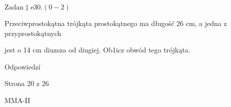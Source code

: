 \documentclass[a4paper,12pt]{article}
\begin{document}
$\mathrm{Z}\mathrm{a}\mathrm{d}\mathrm{a}\mathrm{n}\ddagger \mathrm{e}30. (0-2)$

Przeciwprostokątna trójkąta prostokątnego ma długość 26 cm, a jedna z przyprostokątnych

jest o 14 cm diuzsza od diugiej. Ob1icz obwód tego trójkąta.

Odpowiedzí

Strona 20 z 26

MMA-II
\end{document}
